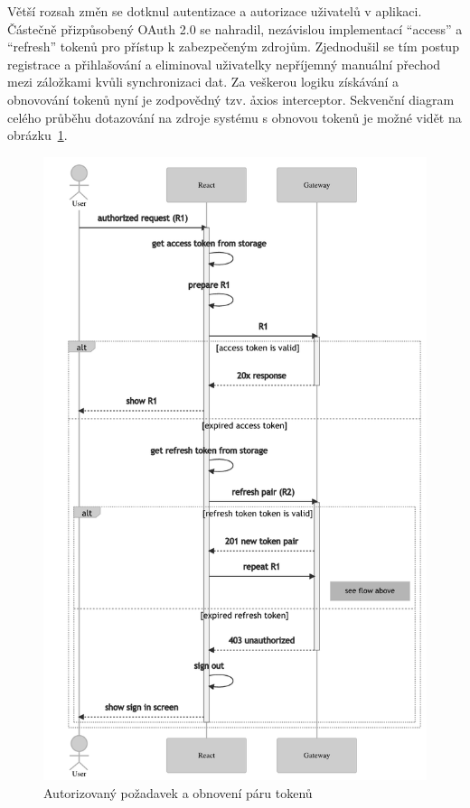 Větší rozsah změn se dotknul autentizace a autorizace uživatelů v aplikaci.
Částečně přizpůsobený OAuth 2.0 se nahradil, nezávislou implementací \enquote{access} a \enquote{refresh} tokenů pro přístup k zabezpečeným zdrojům.
Zjednodušil se tím postup registrace a přihlašování a eliminoval uživatelky nepříjemný manuální přechod mezi záložkami kvůli synchronizaci dat.
Za veškerou logiku získávání a obnovování tokenů nyní je zodpovědný tzv. \h{axios interceptor}.
Sekvenční diagram celého průběhu dotazování na zdroje systému s obnovou tokenů je možné vidět na obrázku~\ref{fig:cli-tokens}.


\begin{figure}[htbp]
   \centering
   \includegraphics[max width=\textwidth]{assets/dia-seq-tokens-bw}
   \caption{Autorizovaný požadavek a obnovení páru tokenů}\label{fig:cli-tokens}
\end{figure}



